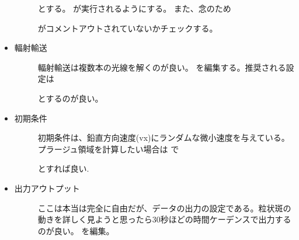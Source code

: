 \documentclass[letterpaper,10pt,dvipdfmx,report]{sphinxmanual}
\begin{document}
\begin{itemize}
\begin{description}
とする。  が実行されるようにする。
また、念のため

\begin{sphinxVerbatim}[commandchars=\\\{\}]
\end{sphinxVerbatim}

がコメントアウトされていないかチェックする。

\end{description}

\item {} \begin{description}
\item[{輻射輸送}] \leavevmode
輻射輸送は複数本の光線を解くのが良い。
 を編集する。推奨される設定は

\begin{sphinxVerbatim}[commandchars=\\\{\}]
     
     
     
\end{sphinxVerbatim}

とするのが良い。

\end{description}

\item {} \begin{description}
\item[{初期条件}] \leavevmode
初期条件は、鉛直方向速度(vx)にランダムな微小速度を与えている。プラージュ領域を計算したい場合は
 で

\begin{sphinxVerbatim}[commandchars=\\\{\}]
  
\end{sphinxVerbatim}

とすれば良い.

\end{description}

\item {} \begin{description}
\item[{出力アウトプット}] \leavevmode
ここは本当は完全に自由だが、データの出力の設定である。粒状斑の動きを詳しく見ようと思ったら30秒ほどの時間ケーデンスで出力するのが良い。
 を編集。


\end{description}
\end{itemize}
\end{document}
